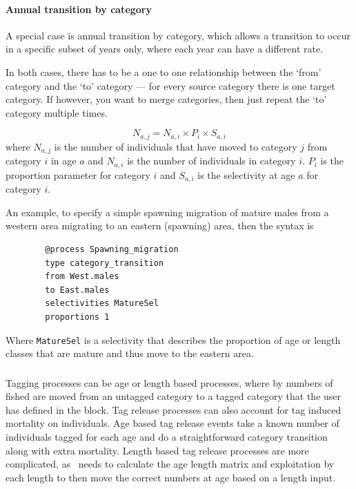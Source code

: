 \paragraph{Annual transition by category}

A special case is annual transition by category, which allows a transition to occur in a specific subset of years only, where each year can have a different rate.

In both cases, there has to be a one to one relationship between the `from' category and the `to' category --- for every source category there is one target category. If however, you want to merge categories, then just repeat the `to' category multiple times. 

\begin{equation}
	N_{a,j} = N_{a,i} \times P_i \times S_{a,i}
\end{equation}
where $N_{a,j}$ is the number of individuals that have moved to category $j$ from category $i$ in age $a$ and $N_{a,i}$ is the number of individuals in category $i$. $P_i$ is the proportion parameter for category $i$ and $S_{a,i}$ is the selectivity at age $a$ for category $i$.

An example, to specify a simple spawning migration of mature males from a western area migrating to an eastern (spawning) area, then the syntax is
{\small{\begin{verbatim}
		@process Spawning_migration
		type category_transition 
		from West.males	
		to East.males	
		selectivities MatureSel
		proportions 1
		\end{verbatim}}}

Where \texttt{MatureSel} is a selectivity that describes the proportion of age or length classes that are mature and thus move to the eastern area.

\subsubsection{}\label{sub:tag_release}

Tagging processes can be age or length based processes, where by numbers of fished are moved from an untagged category to a tagged category that the user has defined in the  block. Tag release processes can also account for tag induced mortality on individuals. Age based tag release events take a known number of individuals tagged for each age and do a straightforward category transition along with extra mortality. Length based tag release processes are more complicated, as \CNAME\ needs to calculate the age length matrix and exploitation by each length to then move the correct numbers at age based on a length input. 


